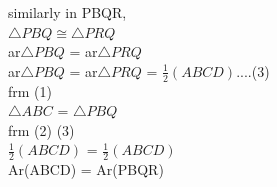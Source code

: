 \begin{frame}
similarly in PBQR,\\
$\triangle{PBQ} \cong \triangle{PRQ}$\\
ar$\triangle{PBQ}$ = ar$\triangle{PRQ}$\\
ar$\triangle{PBQ}$ = ar$\triangle{PRQ}$ = $\frac{1}{2}(ABCD)$....(3)\\
frm (1)\\
$\triangle{ABC}$ = $\triangle{PBQ}$\\
frm (2)  (3)\\
$\frac{1}{2}(ABCD)$ = $\frac{1}{2}(ABCD)$\\
Ar(ABCD) = Ar(PBQR)\\
\end{frame}